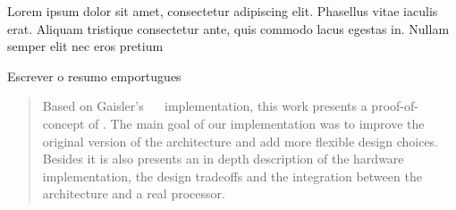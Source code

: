 \paginasiniciais


Lorem ipsum dolor sit amet, consectetur adipiscing elit. Phasellus vitae iaculis erat. Aliquam tristique consectetur ante, quis commodo lacus egestas in. Nullam semper elit nec eros pretium 


%




\begin{resumo}
Escrever o resumo emportugues
\end{resumo}


\begin{abstract}

Based on Gaisler's \leon~\cite{Leon} \fpga~implementation, this work presents a proof-of-concept of \cshia. The main goal of our implementation was to improve the original version of the architecture and add more flexible design choices. Besides it is also presents an in depth description of the hardware implementation, the design tradeoffs and the integration between the architecture and a real processor.

\end{abstract}




\listoffigures

\listoftables





\tableofcontents


\fimdaspaginasiniciais
